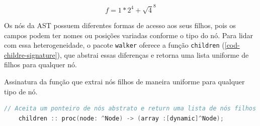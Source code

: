 \begin{equation} \label{eq-svg}
   f =  1*2 ^ 4 + \sqrt 4^8
\end{equation}

Os nós da AST possuem diferentes formas de acesso aos seus filhos, pois os campos podem ter nomes ou posições variadas conforme o tipo do nó. Para lidar com essa heterogeneidade, o pacote \texttt{walker} oferece a função \texttt{children} (\autoref{cod-childre-signature}), que abstrai essas diferenças e retorna uma lista uniforme de filhos para qualquer nó.

\begin{codigo}[H]
        \caption{\small Assinatura da função que extrai nós filhos de maneira uniforme para qualquer tipo de nó.}
        \label{cod-childre-signature}
  \begin{lstlisting}[language = C]
    // Aceita um ponteiro de nós abstrato e return uma lista de nós filhos
    children :: proc(node: ^Node) -> (array :[dynamic]^Node);
  \end{lstlisting}
\end{codigo}

